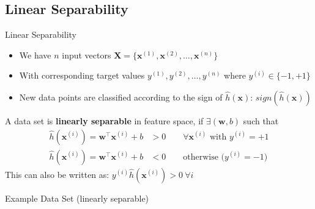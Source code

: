 \subsection{Linear Separability}

\begin{frame}{Linear Separability}{}
	\begin{itemize}
		\item We have $n$ input vectors $\bm{X} = \{ \bm{x}^{(1)}, \bm{x}^{(2)}, \dots, \bm{x}^{(n)} \}$
		\item With corresponding target values $y^{(1)}, y^{(2)}, \dots, y^{(n)}$ where $y^{(i)} \in \{-1, +1\}$
		\item New data points are classified according to the sign of $\widehat{h}(\bm{x})$: $sign(\widehat{h}(\bm{x}))$
	\end{itemize}
	
	\begin{boxBlueNoFrame}
		\footnotesize
		A data set is \textbf{linearly separable} in feature space, if $\exists (\bm{w}, b)$ such that
		\begin{align}
			\widehat{h}(\bm{x}^{(i)}) = \bm{w}^{\intercal} \bm{x}^{(i)} + b &> 0 \qquad
				\text{$\forall \bm{x}^{(i)}$ with $y^{(i)} = +1$} \\
			\widehat{h}(\bm{x}^{(i)}) = \bm{w}^{\intercal} \bm{x}^{(i)} + b &< 0 \qquad
				\text{otherwise ($y^{(i)} = -1$)}
		\end{align}
		This can also be written as: $y^{(i)} \widehat{h}(\bm{x}^{(i)}) > 0\ \forall i$ 
	\end{boxBlueNoFrame}
\end{frame}


\begin{frame}{Example Data Set (linearly separable)}{}
\end{frame}


